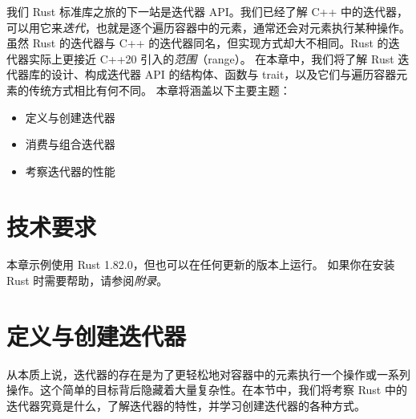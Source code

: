 我们 Rust 标准库之旅的下一站是迭代器 API。我们已经了解 C++ 中的迭代器，可以用它来\emph{迭代}，也就是逐个遍历容器中的元素，通常还会对元素执行某种操作。虽然 Rust 的迭代器与 C++ 的迭代器同名，但实现方式却大不相同。Rust 的迭代器实际上更接近 C++20 引入的\emph{范围}（range）。
在本章中，我们将了解 Rust 迭代器库的设计、构成迭代器 API 的结构体、函数与 trait，以及它们与遍历容器元素的传统方式相比有何不同。
本章将涵盖以下主要主题：
\begin{itemize}
  \item 定义与创建迭代器
  \item 消费与组合迭代器
  \item 考察迭代器的性能
\end{itemize}
\section{技术要求}
本章示例使用 Rust 1.\allowbreak{}82.\allowbreak{}0，但也可以在任何更新的版本上运行。
如果你在安装 Rust 时需要帮助，请参阅\emph{附录}。
\section{定义与创建迭代器}
\label{idx:idx_da13be50}
\label{idx:idx_03837fbb}
从本质上说，迭代器的存在是为了更轻松地对容器中的元素执行一个操作或一系列操作。这个简单的目标背后隐藏着大量复杂性。在本节中，我们将考察 Rust 中的迭代器究竟是什么，了解迭代器的特性，并学习创建迭代器的各种方式。
